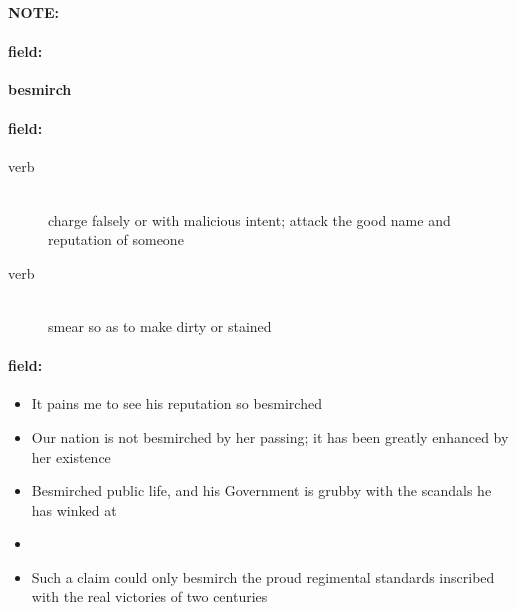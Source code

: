 \documentclass[12pt]{article}
\newenvironment{note}{\paragraph{NOTE:}}{}
\newenvironment{field}{\paragraph{field:}}{}
\begin{document}
\begin{note}
\begin{field}
\textbf{\large besmirch}
\end{field}


\begin{field}
\begin{description}
\item[verb] \hfill \\ 
charge falsely or with malicious intent; attack the good name and reputation of someone

\item[verb] \hfill \\ 
smear so as to make dirty or stained

\end{description}
\end{field}

\begin{field}
\begin{itemize}
\item It pains me to see his reputation so besmirched
\item Our nation is not besmirched by her passing; it has been greatly enhanced by her existence
\item Besmirched public life, and his Government is grubby with the scandals he has winked at
\item 
\item Such a claim could only besmirch the proud regimental standards inscribed with the real victories of two centuries
\end{itemize}
\end{field}
\end{note}
\end{document}
